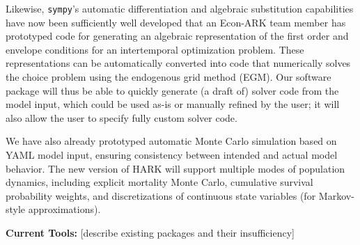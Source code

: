 \documentclass[12pt,pdftex,letterpaper]{article}
\begin{document}
Likewise, \texttt{sympy}'s automatic differentiation and algebraic substitution capabilities have now been sufficiently well developed that an Econ-ARK team member has prototyped code for generating an algebraic representation of the first order and envelope conditions for an intertemporal optimization problem. These representations can be automatically converted into code that numerically solves the choice problem using the endogenous grid method (EGM). Our software package will thus be able to quickly generate (a draft of) solver code from the model input, which could be used as-is or manually refined by the user; it will also allow the user to specify fully custom solver code.

We have also already prototyped automatic Monte Carlo simulation based on YAML model input, ensuring consistency between intended and actual model behavior. The new version of HARK will support multiple modes of population dynamics, including explicit mortality Monte Carlo, cumulative survival probability weights, and discretizations of continuous state variables (for Markov-style approximations).

\vspace{0.5cm}

\noindent \textbf{Current Tools:} [describe existing packages and their insufficiency]
\end{document}
